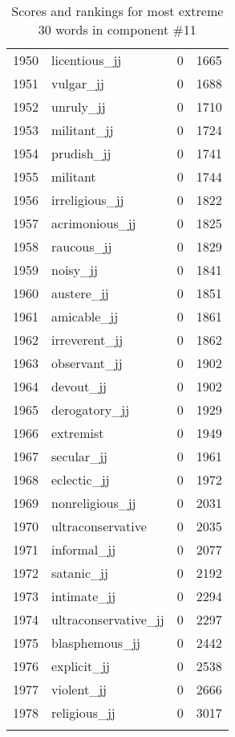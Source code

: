 \begin{longtable}[!htbp]{| rlr@{.}l |}
    1950 & licentious\_jj & 0 & 1665 \\
    1951 & vulgar\_jj & 0 & 1688 \\
    1952 & unruly\_jj & 0 & 1710 \\
    1953 & militant\_jj & 0 & 1724 \\
    1954 & prudish\_jj & 0 & 1741 \\
    1955 & militant & 0 & 1744 \\
    1956 & irreligious\_jj & 0 & 1822 \\
    1957 & acrimonious\_jj & 0 & 1825 \\
    1958 & raucous\_jj & 0 & 1829 \\
    1959 & noisy\_jj & 0 & 1841 \\
    1960 & austere\_jj & 0 & 1851 \\
    1961 & amicable\_jj & 0 & 1861 \\
    1962 & irreverent\_jj & 0 & 1862 \\
    1963 & observant\_jj & 0 & 1902 \\
    1964 & devout\_jj & 0 & 1902 \\
    1965 & derogatory\_jj & 0 & 1929 \\
    1966 & extremist & 0 & 1949 \\
    1967 & secular\_jj & 0 & 1961 \\
    1968 & eclectic\_jj & 0 & 1972 \\
    1969 & nonreligious\_jj & 0 & 2031 \\
    1970 & ultraconservative & 0 & 2035 \\
    1971 & informal\_jj & 0 & 2077 \\
    1972 & satanic\_jj & 0 & 2192 \\
    1973 & intimate\_jj & 0 & 2294 \\
    1974 & ultraconservative\_jj & 0 & 2297 \\
    1975 & blasphemous\_jj & 0 & 2442 \\
    1976 & explicit\_jj & 0 & 2538 \\
    1977 & violent\_jj & 0 & 2666 \\
    1978 & religious\_jj & 0 & 3017 \\
    \hline
    \caption{Scores and rankings for most extreme 30 words in component \#11} \\
\end{longtable}
